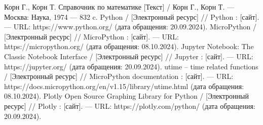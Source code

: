 
\begin{thebibliography}{}
	 Корн Г., Корн Т. Справочник по математике [Текст] / Корн Г., Корн Т. — Москва: Наука, 1974 — 832 c.
	  Python /  [Электронный ресурс] // Python : [сайт]. — URL: https://www.python.org/ (дата обращения: 20.09.2024).
	  MicroPython /  [Электронный ресурс] // MicroPython : [сайт]. — URL: https://micropython.org/ (дата обращения: 08.10.2024).
	  Jupyter Notebook: The Classic Notebook Interface /  [Электронный ресурс] // Jupyter : [сайт]. — URL: https://jupyter.org/ (дата обращения: 20.09.2024).
	  utime – time related functions /  [Электронный ресурс] // MicroPython documentation : [сайт]. — URL: https://docs.micropython.org/en/v1.15/library/utime.html (дата обращения: 08.10.2024).
	  Plotly Open Source Graphing Library for Python /  [Электронный ресурс] // Plotly : [сайт]. — URL: https://plotly.com/python/ (дата обращения: 20.09.2024).
\end{thebibliography}

